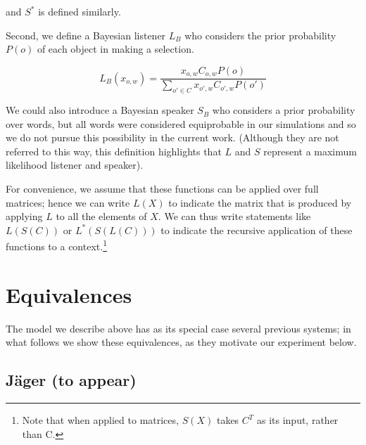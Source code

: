 \documentclass[man,noapacite]{apa2}
\begin{document}
and $S^*$ is defined similarly. 

Second, we define a Bayesian listener $L_B$ who considers the prior probability $P(o)$ of each object in making a selection. 

\begin{equation}
L_B(x_{o,w}) = \frac{x_{o,w} C_{o,w} P(o)}{\displaystyle\sum_{o' \in C} x_{o',w} C_{o',w} P(o')}
\end{equation}

We could also introduce a Bayesian speaker $S_B$ who considers a prior probability over words, but all words were considered equiprobable in our simulations and so we do not pursue this possibility in the current work. (Although they are not referred to this way, this definition highlights that $L$ and $S$ represent a maximum likelihood listener and speaker). 

For convenience, we assume that these functions can be applied over full matrices; hence we can write $L(X)$ to indicate the matrix that is produced by applying $L$ to all the elements of $X$. We can thus write statements like $L(S(C))$ or $L^*(S(L(C)))$ to indicate the recursive application of these functions to a context.\footnote{Note that when applied to matrices, $S(X)$ takes $C^T$ as its input, rather than C.}







\section{Equivalences}

The model we describe above has as its special case several previous systems; in what follows we show these equivalences, as they motivate our experiment below.

\subsection{J\"ager (to appear)}
\end{document}
